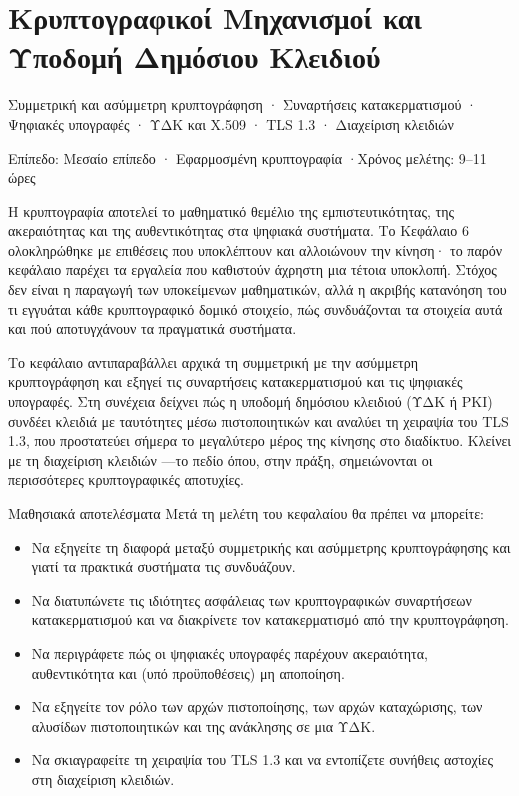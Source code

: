 \documentclass[11pt,openany]{book}
\newcommand{\chaptermeta}[3]{%
  {\sffamily\small\color{accent}#1\par}\vspace{0.3em}
  {\sffamily\footnotesize\color{gray}#2 \quad·\quad #3\par}\vspace{1.2em}}
\begin{document}
\chapter{Κρυπτογραφικοί Μηχανισμοί και Υποδομή Δημόσιου Κλειδιού}\label{ch:7}
\chaptermeta{Συμμετρική και ασύμμετρη κρυπτογράφηση · Συναρτήσεις κατακερματισμού · Ψηφιακές υπογραφές · ΥΔΚ και X.509 · TLS 1.3 · Διαχείριση κλειδιών}{Επίπεδο: Μεσαίο επίπεδο · Εφαρμοσμένη κρυπτογραφία}{Χρόνος μελέτης: 9–11 ώρες}

Η κρυπτογραφία αποτελεί το μαθηματικό θεμέλιο της εμπιστευτικότητας, της ακεραιότητας και της αυθεντικότητας στα ψηφιακά συστήματα. Το Κεφάλαιο 6 ολοκληρώθηκε με επιθέσεις που υποκλέπτουν και αλλοιώνουν την κίνηση· το παρόν κεφάλαιο παρέχει τα εργαλεία που καθιστούν άχρηστη μια τέτοια υποκλοπή. Στόχος δεν είναι η παραγωγή των υποκείμενων μαθηματικών, αλλά η ακριβής κατανόηση του τι εγγυάται κάθε κρυπτογραφικό δομικό στοιχείο, πώς συνδυάζονται τα στοιχεία αυτά και πού αποτυγχάνουν τα πραγματικά συστήματα.

Το κεφάλαιο αντιπαραβάλλει αρχικά τη συμμετρική με την ασύμμετρη κρυπτογράφηση και εξηγεί τις συναρτήσεις κατακερματισμού και τις ψηφιακές υπογραφές. Στη συνέχεια δείχνει πώς η υποδομή δημόσιου κλειδιού (ΥΔΚ ή PKI) συνδέει κλειδιά με ταυτότητες μέσω πιστοποιητικών και αναλύει τη χειραψία του TLS 1.3, που προστατεύει σήμερα το μεγαλύτερο μέρος της κίνησης στο διαδίκτυο. Κλείνει με τη διαχείριση κλειδιών —το πεδίο όπου, στην πράξη, σημειώνονται οι περισσότερες κρυπτογραφικές αποτυχίες.

\begin{outcomesbox}{Μαθησιακά αποτελέσματα}
Μετά τη μελέτη του κεφαλαίου θα πρέπει να μπορείτε:
\begin{itemize}
  \item Να εξηγείτε τη διαφορά μεταξύ συμμετρικής και ασύμμετρης κρυπτογράφησης και γιατί τα πρακτικά συστήματα τις συνδυάζουν.
  \item Να διατυπώνετε τις ιδιότητες ασφάλειας των κρυπτογραφικών συναρτήσεων κατακερματισμού και να διακρίνετε τον κατακερματισμό από την κρυπτογράφηση.
  \item Να περιγράφετε πώς οι ψηφιακές υπογραφές παρέχουν ακεραιότητα, αυθεντικότητα και (υπό προϋποθέσεις) μη αποποίηση.
  \item Να εξηγείτε τον ρόλο των αρχών πιστοποίησης, των αρχών καταχώρισης, των αλυσίδων πιστοποιητικών και της ανάκλησης σε μια ΥΔΚ.
  \item Να σκιαγραφείτε τη χειραψία του TLS 1.3 και να εντοπίζετε συνήθεις αστοχίες στη διαχείριση κλειδιών.
\end{itemize}
\end{outcomesbox}
\end{document}
